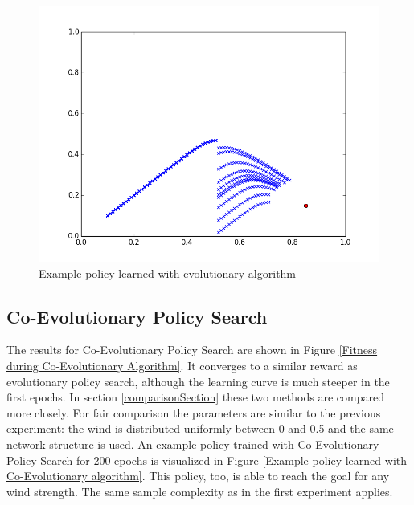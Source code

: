 \begin{figure}[!htb]
  \centering
  \includegraphics[scale=0.5]{images/evo_result.png}
  \caption{Example policy learned with evolutionary algorithm}\label{Example policy learned with evolutionary algorithm}
\end{figure}

\pagebreak
\subsection{Co-Evolutionary Policy Search}

The results for Co-Evolutionary Policy Search are shown in Figure \ref{Fitness during Co-Evolutionary Algorithm}. It converges to a similar reward as evolutionary policy search, although the learning curve is much steeper in the first epochs. In section \ref{comparisonSection} these two methods are compared more closely. For fair comparison the parameters are similar to the previous experiment: the wind is distributed uniformly between 0 and 0.5 and the same network structure is used. An example policy trained with Co-Evolutionary Policy Search for 200 epochs is visualized in Figure \ref{Example policy learned with Co-Evolutionary algorithm}. This policy, too, is able to reach the goal for any wind strength. The same sample complexity as in the first experiment applies.


